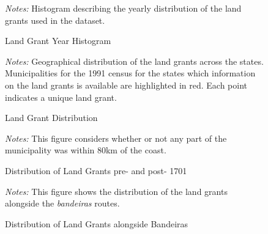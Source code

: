 \documentclass{article}
\begin{document}
\begin{figure}[h!]
  \caption{Land Grant Year Histogram}
  \begin{center}
  \end{center}
  \textit{Notes:} Histogram describing the yearly distribution of the land grants used in the dataset.  
  \label{fig:year_distribution}
\end{figure}

\begin{figure}[h!]
  \caption{Land Grant Distribution}
  \begin{center}
  \end{center}
  \textit{Notes:} Geographical distribution of the land grants across the states. Municipalities for the 1991 census for the states which information on the land grants is available are highlighted in red. Each point indicates a unique land grant. 
  \label{fig:land_grants_distribution}
\end{figure}

\begin{figure}
  \caption{Distribution of Land Grants pre- and post- 1701}
  \begin{center}
  \textit{Notes:} This figure considers whether or not any part of the municipality was within 80km of the coast.
  \end{center}
  \label{fig:SesmariasDistribution}
\end{figure}

\begin{figure}
  \caption{Distribution of Land Grants alongside Bandeiras}
  \begin{center}
  \textit{Notes:} This figure shows the distribution of the land grants alongside the \textit{bandeiras} routes.
  \end{center}
  \label{fig:Bandeiras}
\end{figure}
\end{document}
